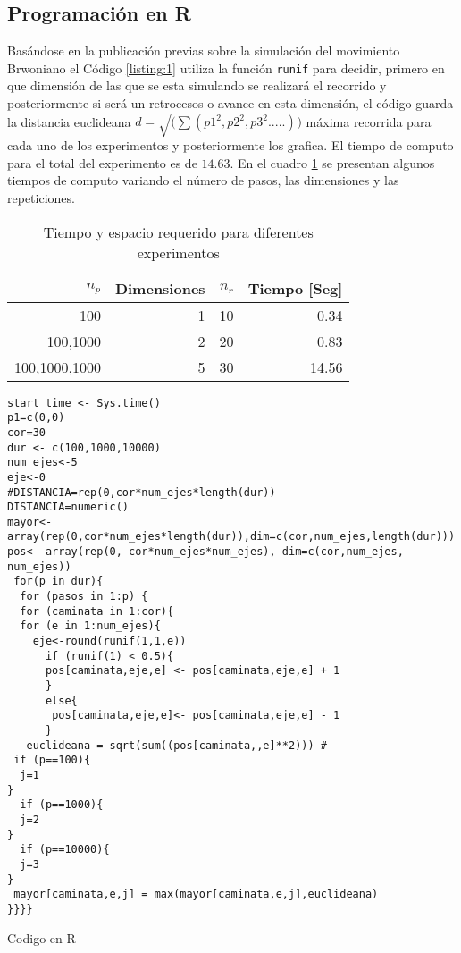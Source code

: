 \documentclass{article}
\renewcommand\lstlistingname{Código}
\begin{document}
\subsection{Programación en R}
Basándose en la publicación previas sobre la simulación del movimiento Brwoniano \citep{E.Schaaefer} el  Código \ref{listing:1} utiliza la función  \texttt{runif} para decidir, primero en que dimensión de las que se esta simulando se realizará el recorrido y posteriormente si será un retrocesos o avance en esta dimensión, el código guarda la distancia euclideana $d=\sqrt{(\sum(p1^2,p2^2,p3^2.....)})$ máxima recorrida  para cada uno de los experimentos y posteriormente los grafica. El tiempo de computo para el total del experimento es de $14.63$. En el cuadro \ref{cuadro 1} se presentan algunos tiempos de computo variando el número de pasos, las dimensiones y las repeticiones.

\begin{table}[]
\centering
\caption{Tiempo y espacio requerido para diferentes experimentos}
\label{cuadro 1}
\begin{tabular}{|r|r|r|r|}
\hline
\textbf{$n_p$} & \textbf{Dimensiones} & \textbf{$n_r$} & \textbf{Tiempo {[}Seg{]}} \\ \hline
100            & 1                    & 10                    & 0.34                      \\ \hline
100,1000       & 2                    & 20                    & 0.83                      \\ \hline
100,1000,1000  & 5                    & 30                    & 14.56                     \\ \hline        
\end{tabular}
\end{table}
\lstset{language=Python}
\lstset{frame=lines}
\lstset{basicstyle=\footnotesize}
\begin{listing}
\renewcommand\lstlistingname{Código}
\begin{verbatim}
start_time <- Sys.time()
p1=c(0,0)
cor=30
dur <- c(100,1000,10000)
num_ejes<-5
eje<-0
#DISTANCIA=rep(0,cor*num_ejes*length(dur))
DISTANCIA=numeric()
mayor<-array(rep(0,cor*num_ejes*length(dur)),dim=c(cor,num_ejes,length(dur)))
pos<- array(rep(0, cor*num_ejes*num_ejes), dim=c(cor,num_ejes, num_ejes))
 for(p in dur){
  for (pasos in 1:p) {
  for (caminata in 1:cor){
  for (e in 1:num_ejes){
    eje<-round(runif(1,1,e))
      if (runif(1) < 0.5){
      pos[caminata,eje,e] <- pos[caminata,eje,e] + 1
      }
      else{
       pos[caminata,eje,e]<- pos[caminata,eje,e] - 1
      }
   euclideana = sqrt(sum((pos[caminata,,e]**2))) # 
 if (p==100){
  j=1
}
  if (p==1000){
  j=2
}
  if (p==10000){
  j=3
}
 mayor[caminata,e,j] = max(mayor[caminata,e,j],euclideana)
}}}}

\end{verbatim}
\caption{Codigo en R}
\label{listing:1}
\end{listing}
\end{document}
